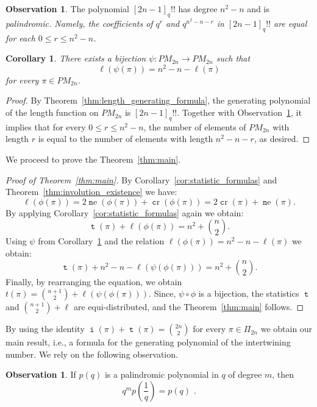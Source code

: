 \documentclass[11pt]{amsart}
\numberwithin{figure}{section}
\DeclareMathOperator{\inumber}{\mathtt i}
\DeclareMathOperator{\dindex}{\mathtt t}
\DeclareMathOperator{\cro}{\mathtt cr}
\DeclareMathOperator{\nst}{\mathtt ne}
\theoremstyle{plain}
\newtheorem{corollary}[theorem]{Corollary}
\theoremstyle{definition}
\newtheorem{observation}[theorem]{Observation}
\begin{document}
\begin{observation}\label{fact:double_factorial_palindrom}
The polynomial $[2n-1]_q!!$ has degree $n^2-n$ and is \em{palindromic}. Namely, the coefficients of $q^r$ and $q^{n^2 - n - r}$ in $[2n-1]_q!!$ are equal for each $0\leq r \leq n^2 - n$.
\end{observation}

\begin{corollary}\label{cor:bruhat_order_inversion}
There exists a bijection  $\psi:PM_{2n}\to PM_{2n}$ such that 
$$\ell(\psi(\pi))=n^2-n-\ell(\pi)$$ 
for every $\pi\in PM_{2n}$.
\end{corollary}
\begin{proof}
By Theorem~\ref{thm:length_generating_formula}, the generating polynomial of the length function on $PM_{2n}$ is $[2n-1]_q!!$. Together with Observation~\ref{fact:double_factorial_palindrom}, it implies that for every $0 \leq r \leq n^2 - n$, the number of elements of $PM_{2n}$ with length $r$ is equal to the number of elements with length $n^2 - n - r$, as desired.
\end{proof}


We proceed to prove the Theorem~\ref{thm:main}.
\begin{proof}[Proof of Theorem~\ref{thm:main}]
By Corollary~\ref{cor:statistic_formulas} and Theorem~\ref{thm:involution_existence} we have:
$$\ell(\phi(\pi)) = 2\nst(\phi(\pi))+\cro(\phi(\pi))=2\cro(\pi)+\nst(\pi).$$
By applying Corollary~\ref{cor:statistic_formulas} again we obtain: 
$$\dindex(\pi) + \ell(\phi(\pi))=n^2+\binom{n}{2}.$$
Using $\psi$ from Corollary~\ref{cor:bruhat_order_inversion} and the relation
$\ell(\phi(\pi))=n^2 - n - \ell(\pi)$ we obtain:
$$\dindex(\pi) + n^2 - n - \ell(\psi(\phi(\pi))) = n^2 + \binom{n}{2}.$$
Finally, by rearranging the equation, we obtain 
$t(\pi)=\binom{n+1}{2}+\ell(\psi(\phi(\pi)))$. Since, $\psi\circ\phi$ is a bijection, the statistics $\dindex$ and $\binom{n+1}{2}+\ell$ are equi-distributed, and the Theorem~\ref{thm:main} follows.
\end{proof}

By using the identity $\inumber(\pi)+\dindex(\pi)=\binom{2n}{2}$ for every $\pi\in\Pi_{2n}$ we obtain our main result, i.e., a formula for the generating polynomial of the intertwining number.
We rely on the following observation.
\begin{observation}\label{fact:palindromic_polynomial_fraq_q}
    If $p(q)$ is a palindromic polynomial in $q$ of degree $m$, then
    $$q^m p\left(\frac{1}{q}\right)=p(q)\,\,.$$
\end{observation}
\end{document}
